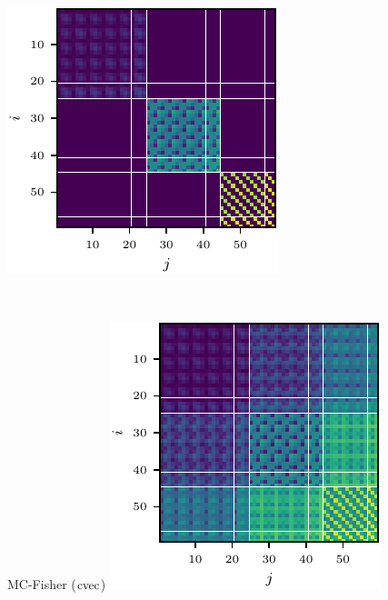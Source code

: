 \begin{figure}[!h]
\begin{minipage}[t]{0.485\linewidth}
    \includegraphics[width=1.0\linewidth]{../kfs/plots/synthetic_cvec_ggn_kfac.pdf}
  \end{minipage}
  \\
  \begin{minipage}[t]{0.485\linewidth}
    \centering
    MC-Fisher ($\operatorname{cvec}$)\vspace{1ex}
    \includegraphics[width=1.0\linewidth]{../kfs/plots/synthetic_cvec_mcfisher_100_full.pdf}

\end{minipage}
\end{figure}
